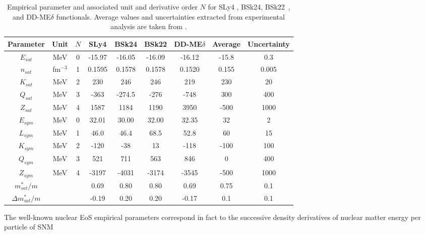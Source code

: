 \begin{table}
\begin{center}
\begin{tabular}{ccccccccc} 
  \toprule
  \toprule
  Parameter & Unit & $N$ & SLy4 & BSk24 & BSk22 & DD-ME$\delta$ & Average & Uncertainty\\
  \midrule
  $E_{sat}$ & MeV & 0         & -15.97 & -16.05  & -16.09    & -16.12 & -15.8 & 0.3   \\
  $n_{sat}$ & fm$^{-3}$ & 1   & 0.1595 &  0.1578 & 0.1578    & 0.1520 & 0.155 & 0.005 \\ 
  $K_{sat}$ & MeV & 2         & 230    &  246    & 246       & 219    & 230   & 20    \\ 
  $Q_{sat}$ & MeV & 3         & -363   &  -274.5 & -276      & -748   & 300   & 400   \\ 
  $Z_{sat}$ & MeV & 4         & 1587   &  1184   & 1190      & 3950   & -500  & 1000  \\ 
  $E_{sym}$ & MeV & 0         & 32.01  &  30.00  & 32.00     & 32.35  & 32    & 2     \\
  $L_{sym}$ & MeV & 1         & 46.0   &  46.4   & 68.5      & 52.8   & 60    & 15    \\
  $K_{sym}$ & MeV & 2         & -120   &  -38    & 13        & -118   & -100  & 100   \\
  $Q_{sym}$ & MeV & 3         & 521    &  711    & 563       & 846    & 0     & 400   \\
  $Z_{sym}$ & MeV & 4         & -3197  &  -4031  & -3174     & -3545  & -500  & 1000  \\
  $m_{sat}^*/m$ & &           & 0.69   &  0.80   & 0.80      & 0.69   & 0.75  & 0.1   \\
  $\Delta m_{sat}^*/m$ & &    & -0.19  &  0.20   & 0.20      & -0.17  & 0.1   & 0.1   \\
  \bottomrule
  \bottomrule
\end{tabular}
\end{center}
\caption[Empirical parameters for several nuclear models and from nuclear
experiments]{Empirical parameter and associated unit and derivative order $N$ for 
  SLy4 \cite{Chabanat1998}, BSk24, BSk22~\cite{Goriely2013}, and 
  DD-ME$\delta$ \cite{RocaMaza2011} functionals.
Average values and uncertainties extracted from experimental analysis are taken
from \cite{Margueron2018a}.}\label{table:emp_params}
\end{table}
%
The well-known nuclear EoS empirical parameters correspond in fact to the 
successive density derivatives of nuclear matter energy per particle of SNM 
